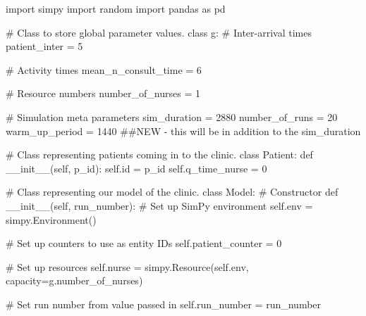 \documentclass[
  letterpaper,
  DIV=11,
  numbers=noendperiod]{scrreprt}
\newenvironment{Shaded}{}{}
\newcommand{\BuiltInTok}[1]{\textcolor[rgb]{0.84,0.23,0.29}{#1}}
\newcommand{\CommentTok}[1]{\textcolor[rgb]{0.42,0.45,0.49}{#1}}
\newcommand{\DecValTok}[1]{\textcolor[rgb]{0.00,0.36,0.77}{#1}}
\newcommand{\FunctionTok}[1]{\textcolor[rgb]{0.44,0.26,0.76}{#1}}
\newcommand{\ImportTok}[1]{\textcolor[rgb]{0.01,0.18,0.38}{#1}}
\newcommand{\KeywordTok}[1]{\textcolor[rgb]{0.84,0.23,0.29}{#1}}
\newcommand{\NormalTok}[1]{\textcolor[rgb]{0.14,0.16,0.18}{#1}}
\newcommand{\OperatorTok}[1]{\textcolor[rgb]{0.14,0.16,0.18}{#1}}
\newcommand{\VariableTok}[1]{\textcolor[rgb]{0.89,0.38,0.04}{#1}}
\begin{document}
\label{code_full_warm_up}
\begin{Shaded}
\begin{Highlighting}[]
\ImportTok{import}\NormalTok{ simpy}
\ImportTok{import}\NormalTok{ random}
\ImportTok{import}\NormalTok{ pandas }\ImportTok{as}\NormalTok{ pd}

\CommentTok{\# Class to store global parameter values.}
\KeywordTok{class}\NormalTok{ g:}
    \CommentTok{\# Inter{-}arrival times}
\NormalTok{    patient\_inter }\OperatorTok{=} \DecValTok{5}

    \CommentTok{\# Activity times}
\NormalTok{    mean\_n\_consult\_time }\OperatorTok{=} \DecValTok{6}

    \CommentTok{\# Resource numbers}
\NormalTok{    number\_of\_nurses }\OperatorTok{=} \DecValTok{1}

    \CommentTok{\# Simulation meta parameters}
\NormalTok{    sim\_duration }\OperatorTok{=} \DecValTok{2880}
\NormalTok{    number\_of\_runs }\OperatorTok{=} \DecValTok{20}
\NormalTok{    warm\_up\_period }\OperatorTok{=} \DecValTok{1440} \CommentTok{\#\#NEW {-} this will be in addition to the sim\_duration}

\CommentTok{\# Class representing patients coming in to the clinic.}
\KeywordTok{class}\NormalTok{ Patient:}
    \KeywordTok{def} \FunctionTok{\_\_init\_\_}\NormalTok{(}\VariableTok{self}\NormalTok{, p\_id):}
        \VariableTok{self}\NormalTok{.}\BuiltInTok{id} \OperatorTok{=}\NormalTok{ p\_id}
        \VariableTok{self}\NormalTok{.q\_time\_nurse }\OperatorTok{=} \DecValTok{0}

\CommentTok{\# Class representing our model of the clinic.}
\KeywordTok{class}\NormalTok{ Model:}
    \CommentTok{\# Constructor}
    \KeywordTok{def} \FunctionTok{\_\_init\_\_}\NormalTok{(}\VariableTok{self}\NormalTok{, run\_number):}
        \CommentTok{\# Set up SimPy environment}
        \VariableTok{self}\NormalTok{.env }\OperatorTok{=}\NormalTok{ simpy.Environment()}

        \CommentTok{\# Set up counters to use as entity IDs}
        \VariableTok{self}\NormalTok{.patient\_counter }\OperatorTok{=} \DecValTok{0}

        \CommentTok{\# Set up resources}
        \VariableTok{self}\NormalTok{.nurse }\OperatorTok{=}\NormalTok{ simpy.Resource(}\VariableTok{self}\NormalTok{.env, capacity}\OperatorTok{=}\NormalTok{g.number\_of\_nurses)}

        \CommentTok{\# Set run number from value passed in}
        \VariableTok{self}\NormalTok{.run\_number }\OperatorTok{=}\NormalTok{ run\_number}


\end{Highlighting}
\end{Shaded}
\end{document}
